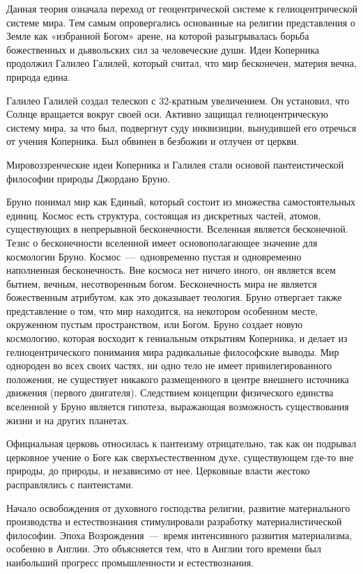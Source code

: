 \documentclass[14pt]{extarticle}
\begin{document}
Данная теория означала переход от геоцентрической системе к гелиоцентрической системе мира. Тем самым опровергались основанные на религии представления о Земле как «избранной Богом» арене, на которой разыгрывалась борьба божественных и дьявольских сил за человеческие души. Идеи Коперника продолжил Галилео Галилей, который считал, что мир бесконечен, материя вечна, природа едина.

Галилео Галилей создал телескоп с 32-кратным увеличением. Он установил, что Солнце вращается вокруг своей оси. Активно защищал гелиоцентрическую систему мира, за что был, подвергнут суду инквизиции, вынудившей его отречься от учения Коперника. Был обвинен в безбожии и отлучен от церкви.

Мировоззренческие идеи Коперника и Галилея стали основой пантеистической философии при­роды Джордано Бруно.

Бруно понимал мир как Единый, который состоит из множества самостоятельных единиц. Космос есть структура, состоящая из дискретных частей, атомов, существующих в непрерывной бесконечности. Вселенная является бесконечной. Тезис о бесконечности вселенной имеет основопо­лагающее значение для космологии Бруно. Космос~---~одновременно пустая и одновременно наполненная бесконечность. Вне космоса нет ничего иного, он является всем бытием, вечным, несотворенным богом. Бесконечность мира не является божественным атри­бутом, как это доказывает теология. Бруно отвергает также представление о том, что мир находится, на некотором особенном месте, окруженном пустым пространством, или Богом. Бруно создает новую космологию, которая восходит к гениальным открытиям Коперника, и делает из гелиоцентрического понимания мира радикальные философские выводы. Мир однороден во всех своих частях, ни одно тело не имеет привилегированного положения, не су­ществует никакого размещенного в центре внешнего источника движения (первого двигателя). Следстви­ем концепции физического единства вселенной у Бруно является гипотеза, выражающая возможность существования жизни и на других планетах.

Официальная церковь относилась к пантеизму отрицательно, так как он подрывал церковное учение о Боге как сверхъестественном духе, существующем где-то вне природы, до природы, и независимо от нее. Церковные власти жестоко расправлялись с пантеистами.

Начало освобождения от духовного господства религии, развитие материального производства и естествознания стимулировали разработку материалистической философии. Эпоха Возрождения~---~время интенсивного развития материализма, особенно в Англии. Это объясняется тем, что в Англии того времени был наибольший прогресс промышленности и естествознания.
\end{document}
